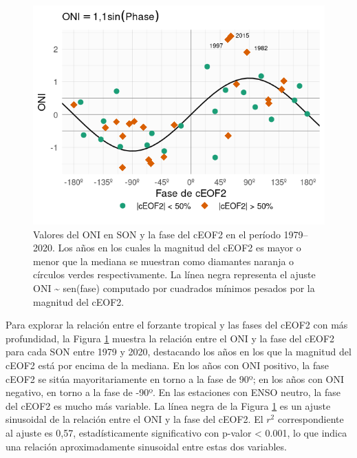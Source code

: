 \documentclass[12pt,oneside,a4paper]{reedthesis}
\begin{document}
\begin{figure}

{\centering \includegraphics{figures/20-ceofs/enso-phase-1} 

}

\caption{Valores del ONI en SON y la fase del cEOF2 en el período 1979--2020. Los años en los cuales la magnitud del cEOF2 es mayor o menor que la mediana se muestran como diamantes naranja o círculos verdes respectivamente. La línea negra representa el ajuste ONI \textasciitilde{} sen(fase) computado por cuadrados mínimos pesados por la magnitud del cEOF2.}\label{fig:enso-phase}
\end{figure}

Para explorar la relación entre el forzante tropical y las fases del cEOF2 con más profundidad, la Figura \ref{fig:enso-phase} muestra la relación entre el ONI y la fase del cEOF2 para cada SON entre 1979 y 2020, destacando los años en los que la magnitud del cEOF2 está por encima de la mediana.
En los años con ONI positivo, la fase cEOF2 se sitúa mayoritariamente en torno a la fase de 90º; en los años con ONI negativo, en torno a la fase de -90º.
En las estaciones con ENSO neutro, la fase del cEOF2 es mucho más variable.
La línea negra de la Figura \ref{fig:enso-phase} es un ajuste sinusoidal de la relación entre el ONI y la fase del cEOF2.
El \(r^2\) correspondiente al ajuste es 0,57, estadísticamente significativo con p-valor \textless{} 0.001, lo que indica una relación aproximadamente sinusoidal entre estas dos variables.
\end{document}
